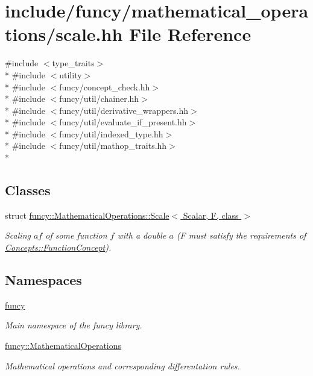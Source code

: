 \hypertarget{scale_8hh}{\section{include/funcy/mathematical\-\_\-operations/scale.hh File Reference}
\label{scale_8hh}
}
{\ttfamily \#include $<$type\-\_\-traits$>$}\\*
{\ttfamily \#include $<$utility$>$}\\*
{\ttfamily \#include $<$funcy/concept\-\_\-check.\-hh$>$}\\*
{\ttfamily \#include $<$funcy/util/chainer.\-hh$>$}\\*
{\ttfamily \#include $<$funcy/util/derivative\-\_\-wrappers.\-hh$>$}\\*
{\ttfamily \#include $<$funcy/util/evaluate\-\_\-if\-\_\-present.\-hh$>$}\\*
{\ttfamily \#include $<$funcy/util/indexed\-\_\-type.\-hh$>$}\\*
{\ttfamily \#include $<$funcy/util/mathop\-\_\-traits.\-hh$>$}\\*
\subsection*{Classes}
\begin{DoxyCompactItemize}
\item 
struct \hyperlink{structfuncy_1_1MathematicalOperations_1_1Scale}{funcy\-::\-Mathematical\-Operations\-::\-Scale$<$ Scalar, F, class $>$}
\begin{DoxyCompactList}\small\item\em Scaling $ af $ of some function $ f $ with a double $ a $ (F must satisfy the requirements of \hyperlink{structfuncy_1_1Concepts_1_1FunctionConcept}{Concepts\-::\-Function\-Concept}). \end{DoxyCompactList}\end{DoxyCompactItemize}
\subsection*{Namespaces}
\begin{DoxyCompactItemize}
\item 
\hyperlink{namespacefuncy}{funcy}
\begin{DoxyCompactList}\small\item\em Main namespace of the funcy library. \end{DoxyCompactList}\item 
\hyperlink{namespacefuncy_1_1MathematicalOperations}{funcy\-::\-Mathematical\-Operations}
\begin{DoxyCompactList}\small\item\em Mathematical operations and corresponding differentation rules. \end{DoxyCompactList}\end{DoxyCompactItemize}
